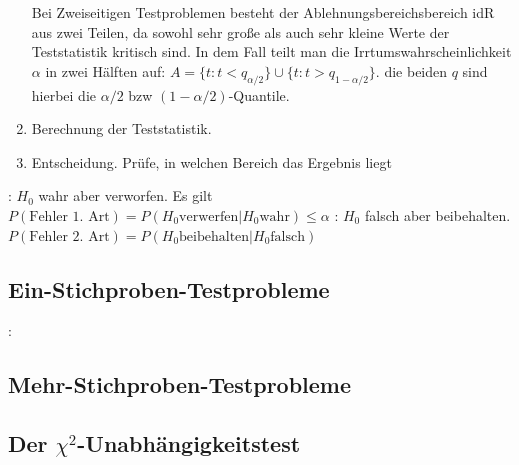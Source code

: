 \begin{enumerate}[leftmargin=*]
    Bei Zweiseitigen Testproblemen besteht der Ablehnungsbereichsbereich idR aus zwei Teilen, da sowohl sehr große als auch sehr kleine Werte der Teststatistik kritisch sind. In dem Fall teilt man die Irrtumswahrscheinlichkeit $\alpha$ in zwei Hälften auf: $A = \{t: t<q_{\alpha/2}\} \cup \{t: t>q_{1 - \alpha/2}\}$. die beiden $q$ sind hierbei die $\alpha/2$ bzw $(1 - \alpha/2)$-Quantile.
    \item Berechnung der Teststatistik. 
    \item Entscheidung. Prüfe, in welchen Bereich das Ergebnis liegt 
\end{enumerate}
: $H_0$ wahr aber verworfen. Es gilt $P(\text{Fehler 1. Art}) = P(H_0 \text{verwerfen} | H_0 \text{wahr}) \le \alpha$ : $H_0$ falsch aber beibehalten.$P(\text{Fehler 2. Art}) = P(H_0 \text{beibehalten} | H_0 \text{falsch})$ 
\subsection{Ein-Stichproben-Testprobleme}
: 
\subsection{Mehr-Stichproben-Testprobleme}
\subsection{Der $\chi^2$-Unabhängigkeitstest}